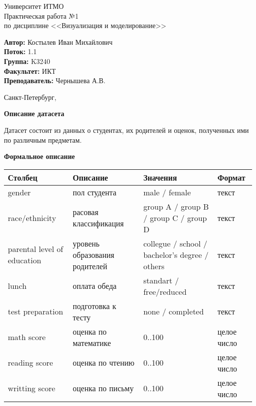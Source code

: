 \documentclass[12pt,a4paper]{article}
\begin{document}
	
\begin{titlepage}
	
\begin{center}
	\large Университет ИТМО\\[5cm]
	\LARGE Практическая работа №1\\
	\normalsize по дисциплине <<Визуализация и моделирование>>\\[5cm]
\end{center}
\begin{flushright}
		\begin{minipage}{0.6\textwidth}
		\begin{flushleft}
			\large
			\singlespacing 
			\textbf{Автор:} Костылев Иван Михайлович\\
			\textbf{Поток:} 1.1\\
			\textbf{Группа:} K3240\\
			\textbf{Факультет:} ИКТ\\
			\textbf{Преподаватель:} Чернышева А.В.
		\end{flushleft}
	\end{minipage}
\end{flushright}

\vfill

\begin{center}
	{\large Санкт-Петербург, \the{}}
\end{center}
 
\end{titlepage}
\normalsize


\large \textbf{Описание датасета}

\normalsize
	Датасет состоит из данных о студентах, их родителей и оценок, полученных ими по различным предметам.



\large \textbf{Формальное описание}

\begin{tabular}{ | p{100pt} | p{140pt} | p{140pt} | p{50pt} | }
\hline
Столбец & Описание & Значения & Формат  \\ \hline
gender & пол студента & male / female & текст\\ \hline
race/ethnicity & расовая классификация & group A / group B / group C / group D & текст \\ \hline
parental level of education & уровень образования родителей & collegue / school / bachelor's degree / others & текст \\ \hline
lunch & оплата обеда & standart / free/reduced & текст \\ \hline
test preparation & подготовка к тесту & none / completed & текст \\ \hline
math score & оценка по математике & 0..100 & целое число \\ \hline
reading score & оценка по чтению & 0..100 & целое число \\ \hline
writting score & оценка по письму & 0..100 & целое число \\ \hline
\end{tabular}
\\
\end{document}
